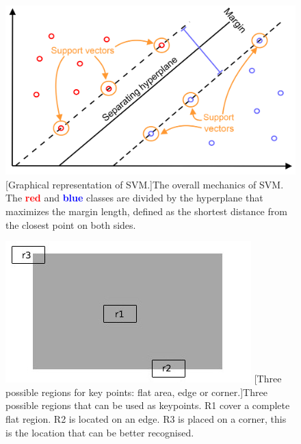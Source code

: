 \begin{figure}
	\centering
	\begin{minipage}{.59\textwidth}
		\centering
		\includegraphics[width=1\linewidth]{images/recognition/howItWorks_svm}
		[Graphical representation of SVM.]{The overall mechanics of SVM. The \textbf{\textcolor{red}{red}} and \textbf{\textcolor{blue}{blue}} classes are divided by the hyperplane that maximizes the margin length, defined as the shortest distance from the closest point on both sides.}
		\label{fig:howItWorks_svm}
	\end{minipage}
	\begin{minipage}{.39\textwidth}
		\centering
		\includegraphics[width=1\linewidth]{images/recognition/kpMatch_regions}
		\captionsetup{margin=0.5cm}
		[Three possible regions for key points: flat area, edge or corner.]{Three possible regions that can be used as keypoints. R1 cover a complete flat region. R2 is located on an edge. R3 is placed on a corner, this is the location that can be better recognised.}
		\label{fig:kpMatch_regions}
	\end{minipage}
\end{figure}

